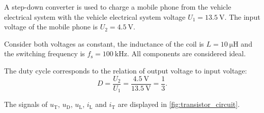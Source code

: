 
A step-down converter is used to charge a mobile phone from the vehicle electrical system with the vehicle electrical 
system voltage $U_1 = \SI{13.5}{\volt}$. The input voltage of the mobile phone is $U_2 = \SI{4.5}{\volt}$.



Consider both voltages as constant, the inductance of the coil is $L = \SI{10}{\micro\henry}$ and the switching frequency is $f_\mathrm{s} = \SI{ 100}{\kilo\hertz}$. All components are considered ideal.


\begin{solutionblock}



\end{solutionblock}

\begin{solutionblock}
    The duty cycle corresponds to the relation of output voltage to input voltage:
    \begin{equation}
        D = \frac{U_2}{U_1} = \frac{\SI{ 4.5}{\volt}}{\SI{ 13.5}{\volt}} = \frac{1}{3}.
    \end{equation}
\end{solutionblock}
   
\begin{solutionblock} %
The signals of $u_\mathrm{T}$, $u_\mathrm{D}$, $u_\mathrm{L}$, $i_\mathrm{L}$ and $i_\mathrm{T}$ are displayed in \autoref{fig:transistor_circuit}.



\end{solutionblock}

